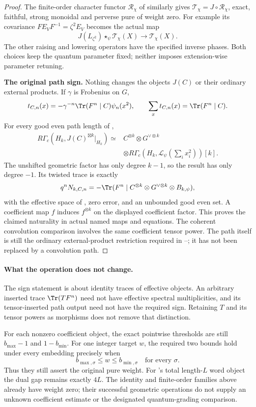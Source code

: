 \begin{proof}
The finite-order character functor $\mathcal R_\chi$
of  similarly gives
$\mathcal T_\chi=J\circ\mathcal R_\chi$, exact,
faithful, strong monoidal and perverse pure of weight zero.
For example its covariance
$FE_VF^{-1}=\zeta^2E_V$ becomes the actual map
\[
 J(L_{\zeta^2})\star_\psi\mathcal T_\chi(X)
       \longrightarrow\mathcal T_\chi(X).
\]
The other raising and lowering operators have the
specified inverse phases.
Both choices keep the quantum parameter fixed;
neither imposes extension-wise parameter retuning.

\par\smallskip\noindent\textbf{The original path sign.}\quad
Nothing changes the objects $J(C)$ or their ordinary
external products. If $\gamma$ is Frobenius on $G$,
\[
 t_{C,n}(x)=-\gamma^{-n}\Tr(F^n\mid C)\psi_n(x^2),
 \qquad \sum_x t_{C,n}(x)=\Tr(F^n\mid C).
\]
For every good even path length of ,
\[
\begin{aligned}
 R\Gamma_c(H_k,J(C)^{\boxtimes k}|_{H_k})
 \simeq{}& C^{\otimes k}\otimes G^{\vee\otimes k}\\
 &\otimes
 R\Gamma_c(H_k,\mathcal L_\psi(\textstyle\sum_i x_i^2))[k].
\end{aligned}
\]
The unshifted geometric factor has only degree $k-1$,
so the result has only degree $-1$.
Its twisted trace is exactly
\[
 q^nN_{k,C,n}
   =-\Tr(F^n\mid
       C^{\otimes k}\otimes G^{\vee\otimes k}\otimes B_{k,\psi}),
\]
with the effective space of , zero error,
and an unbounded good even set.
A coefficient map $f$ induces $f^{\otimes k}$ on
the displayed coefficient factor. This proves the
claimed naturality in actual named maps and equations.
The coherent convolution comparison involves the
same coefficient tensor power.
The path itself is still the ordinary external-product
restriction required in --;
it has not been replaced by a convolution path.
\end{proof}

\paragraph{What the operation does not change.}
The sign statement is about identity traces of effective
objects. An arbitrary inserted trace $\Tr(TF^n)$ need
not have effective spectral multiplicities, and its
tensor-inserted path output need not have the required
sign. Retaining $T$ and its tensor powers as morphisms
does not remove that distinction.

For each nonzero coefficient object, the exact pointwise
thresholds are still $b_{\max}-1$ and $1-b_{\min}$.
For one integer target $w$, the required two bounds
hold under every embedding precisely when
\[
 b_{\max,\sigma}\le w\le b_{\min,\sigma}
                    \quad\text{for every }\sigma.
\]
Thus they still assert the original pure weight.
For 's total length-$L$ word object the
dual gap remains exactly $4L$.
The identity and finite-order families above already
have weight zero; their successful geometric operations
do not supply an unknown coefficient estimate or the
designated quantum-grading comparison.

